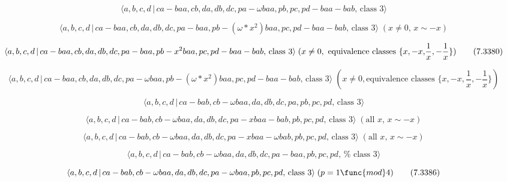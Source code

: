 \documentclass[10pt]{article}
\begin{document}
\begin{equation}
\langle a,b,c,d\,|\,ca-baa,cb,da,db,dc,pa-\omega baa,pb,pc,pd-baa-bab,\,%
\text{class }3\rangle  \tag{7.3378}
\end{equation}

\begin{equation}
\langle a,b,c,d\,|\,ca-baa,cb,da,db,dc,pa-baa,pb-(\omega \ast
x^{2})baa,pc,pd-baa-bab,\,\text{class }3\rangle \;(x\neq 0,\,x\sim -x) 
\tag{7.3379}
\end{equation}

\begin{equation}
\langle a,b,c,d\,|\,ca-baa,cb,da,db,dc,pa-baa,pb-x^{2}baa,pc,pd-baa-bab,\,%
\text{class }3\rangle \;(x\neq 0,\text{ equivalence classes }\{{x,-x,}\frac{{%
1}}{x}{,-}\frac{{1}}{x}\})  \tag{7.3380}
\end{equation}

\begin{equation}
\langle a,b,c,d\,|\,ca-baa,cb,da,db,dc,pa-\omega baa,pb-(\omega \ast
x^{2})baa,pc,pd-baa-bab,\,\text{class }3\rangle \;(x\neq 0,\text{
equivalence classes }\{{x,-x,}\frac{{1}}{x}{,-}\frac{{1}}{x}\})  \tag{7.3381}
\end{equation}

\begin{equation}
\langle a,b,c,d\,|\,ca-bab,cb-\omega baa,da,db,dc,pa,pb,pc,pd,\,\text{class }%
3\rangle  \tag{7.3382}
\end{equation}

\begin{equation}
\langle a,b,c,d\,|\,ca-bab,cb-\omega baa,da,db,dc,pa-xbaa-bab,pb,pc,pd,\,%
\text{class }3\rangle \;(\text{all }x,\,x\sim -x)  \tag{7.3383}
\end{equation}

\begin{equation}
\langle a,b,c,d\,|\,ca-bab,cb-\omega baa,da,db,dc,pa-xbaa-\omega
bab,pb,pc,pd,\,\text{class }3\rangle \;(\text{all }x,\,x\sim -x) 
\tag{7.3384}
\end{equation}

\begin{equation}
\langle a,b,c,d\,|\,ca-bab,cb-\omega baa,da,db,dc,pa-baa,pb,pc,pd,\,\text{%
class }3\rangle  \tag{7.3385}
\end{equation}

\begin{equation}
\langle a,b,c,d\,|\,ca-bab,cb-\omega baa,da,db,dc,pa-\omega baa,pb,pc,pd,\,%
\text{class }3\rangle \;(p=1\func{mod}4)  \tag{7.3386}
\end{equation}
\end{document}
